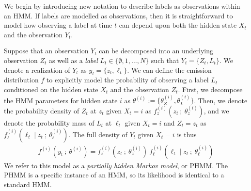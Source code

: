 
We begin by introducing new notation to describe labels as observations within an HMM. If labels are modelled as observations, then it is straightforward to model how observing a label at time $t$ can depend upon both the hidden state $X_t$ and the observation $Y_t$.

Suppose that an observation $Y_t$ can be decomposed into an underlying observation $Z_t$ as well as a \textit{label} $L_t \in \{\emptyset,1,\ldots,N\}$ such that $Y_t = \{Z_t,L_t\}$. We denote a realization of $Y_t$ as $y_t = \{z_t,\ell_t\}$.
%
%
%
%
%
%
We can define the emission distribution $f$ to explicitly model the probability of observing a label $L_t$ conditioned on the hidden state $X_t$ and the observation $Z_t$. First, we decompose the HMM parameters for hidden state $i$ as $\theta^{(i)} := \{\theta^{(i)}_{Z},\theta_{L}^{(i)}\}$. Then, we denote the probability density of $Z_t$ at $z_t$ given $X_t = i$ as $f_{z}^{(i)}(z_t ~;~ \theta_{z}^{(i)})$, and we denote the probability mass of $L_t$ at $\ell_t$ given $X_t = i$ and $Z_t = z_t$ as $f_{\ell}^{(i)}(\ell_t \mid z_t ~;~ \theta^{(i)}_{\ell})$. The full density of $Y_t$ given $X_t = i$ is thus
%
\begin{gather}
    f^{(i)}(y_t ~;~ \theta^{(i)}) = f_{z}^{(i)}(z_t ~;~ \theta_{z}^{(i)}) ~ f_{\ell}^{(i)}(\ell_t \mid z_t ~;~ \theta^{(i)}_{\ell})
    \label{eqn:PHMM_emis}
\end{gather}
%
We refer to this model as a \textit{partially hidden Markov model}, or PHMM. The PHMM is a specific instance of an HMM, so its likelihood is identical to a standard HMM.


